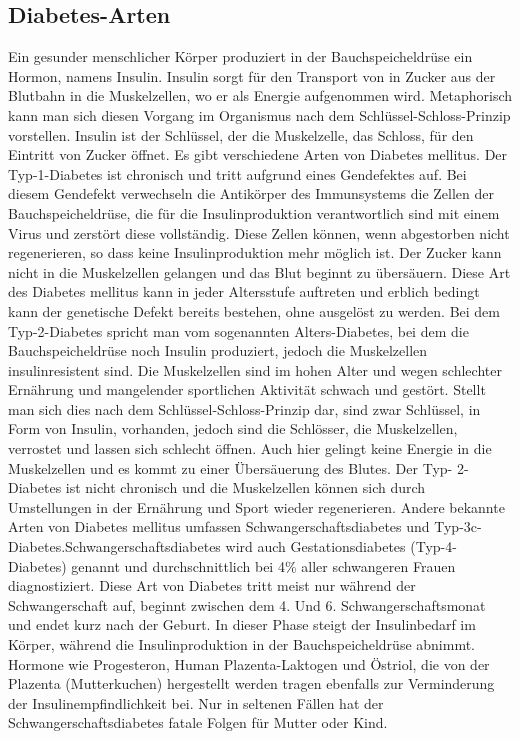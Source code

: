 \documentclass[a4paper,11pt]{article}%
\renewcommand{\\}{\vspace*{0.5\baselineskip} \newline}
\begin{document}
	\subsection{Diabetes-Arten}
	Ein gesunder menschlicher Körper produziert in der Bauchspeicheldrüse ein Hormon, namens Insulin. Insulin sorgt für den Transport von in Zucker aus der Blutbahn in die Muskelzellen, wo er als Energie aufgenommen wird. Metaphorisch kann man sich diesen Vorgang im Organismus nach dem Schlüssel-Schloss-Prinzip vorstellen. Insulin ist der Schlüssel, der die Muskelzelle, das Schloss, für den Eintritt von Zucker öffnet. Es gibt verschiedene Arten von Diabetes mellitus.\\	
	Der Typ-1-Diabetes ist chronisch und tritt aufgrund eines Gendefektes auf. Bei diesem Gendefekt verwechseln die Antikörper des Immunsystems die Zellen der Bauchspeicheldrüse, die für die Insulinproduktion verantwortlich sind mit einem Virus und zerstört diese vollständig. Diese Zellen können, wenn abgestorben nicht regenerieren, so dass keine Insulinproduktion mehr möglich ist. Der Zucker kann nicht in die Muskelzellen gelangen und das Blut beginnt zu übersäuern. Diese Art des Diabetes mellitus kann in jeder Altersstufe auftreten und erblich bedingt kann der genetische Defekt bereits bestehen, ohne ausgelöst zu werden.\\
	Bei dem Typ-2-Diabetes spricht man vom sogenannten \glqq Alters-Diabetes\grqq{}, bei dem die Bauchspeicheldrüse noch Insulin produziert, jedoch die Muskelzellen insulinresistent sind. Die Muskelzellen sind im hohen Alter und wegen schlechter Ernährung und mangelender sportlichen Aktivität schwach und gestört. Stellt man sich dies nach dem Schlüssel-Schloss-Prinzip dar, sind zwar Schlüssel, in Form von Insulin, vorhanden, jedoch sind die Schlösser, die Muskelzellen, verrostet und lassen sich schlecht öffnen. Auch hier gelingt keine Energie in die Muskelzellen und es kommt zu einer Übersäuerung des Blutes. Der Typ- 2-Diabetes ist nicht chronisch und die Muskelzellen können sich durch Umstellungen in der Ernährung und Sport wieder regenerieren.\\
	Andere bekannte Arten von Diabetes mellitus umfassen Schwangerschaftsdiabetes und Typ-3c-Diabetes.Schwangerschaftsdiabetes wird auch Gestationsdiabetes (Typ-4-Diabetes) genannt und durchschnittlich bei 4\% aller schwangeren Frauen diagnostiziert. Diese Art von Diabetes tritt meist nur während der Schwangerschaft auf, beginnt zwischen dem 4. Und 6. Schwangerschaftsmonat und endet kurz nach der Geburt. In dieser Phase steigt der Insulinbedarf im Körper, während die Insulinproduktion in der Bauchspeicheldrüse abnimmt. Hormone wie Progesteron, Human Plazenta-Laktogen und Östriol, die von der Plazenta (Mutterkuchen) hergestellt werden tragen ebenfalls zur Verminderung der Insulinempfindlichkeit bei. Nur in seltenen Fällen hat der Schwangerschaftsdiabetes fatale Folgen für Mutter oder Kind.\\
\end{document}

